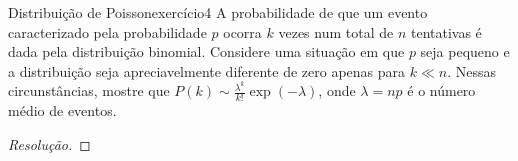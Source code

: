 \begin{exercício}{Distribuição de Poisson}{exercício4}
    A probabilidade de que um evento caracterizado pela probabilidade \(p\) ocorra \(k\) vezes num total de \(n\) tentativas é dada pela distribuição binomial. Considere uma situação em que \(p\) seja pequeno e a distribuição seja apreciavelmente diferente de zero apenas para \(k \ll n\). Nessas circunstâncias, mostre que \(P(k) \sim \frac{\lambda^k}{k!}\exp(-\lambda)\), onde \(\lambda = np\) é o número médio de eventos.
\end{exercício}
\begin{proof}[Resolução]

\end{proof}
